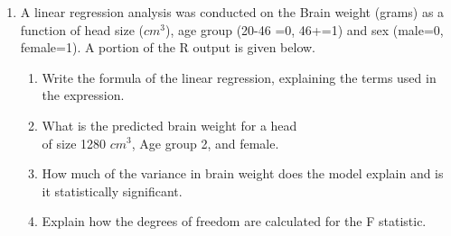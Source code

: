 \documentclass[a4paper,12pt]{article}
\theoremstyle{Qstyle}
\begin{document}
\begin{enumerate}
	\newpage
		\item A linear regression analysis was conducted on the Brain weight (grams) as a function of head size ($cm^3$), age group (20-46 =0, 46+=1) and sex (male=0, female=1). A portion of the R output is given below.\\
		\noindent{}		
		
		\begin{enumerate}
			
			\item Write the formula of the linear regression, explaining the terms used in the expression.
			
			\item What is the predicted brain weight for a head\\ of size 1280 $cm^3$, Age group 2, and female. 
			\item  How much of the variance in brain weight does the model explain and is it statistically significant. 
			\item Explain how the degrees of freedom are calculated for the F statistic.
		\end{enumerate}		
		
		
		
	\end{enumerate}
	
\end{document}
